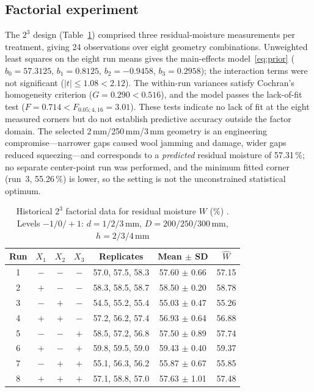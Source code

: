 \documentclass[journal]{IEEEtran}
\begin{document}
\subsection{Factorial experiment}
The $2^3$ design (Table~\ref{tab:doe}) comprised three residual-moisture measurements per
treatment, giving 24 observations over eight geometry combinations. Unweighted least squares on the eight run means
gives the main-effects model~\eqref{eq:prior} ($b_0=57.3125$, $b_1=0.8125$, $b_2=-0.9458$, $b_3=0.2958$); the
interaction terms were not significant ($|t|\le1.08<2.12$). The within-run variances satisfy Cochran's homogeneity
criterion ($G=0.290<0.516$), and the model passes the lack-of-fit test ($F=0.714<F_{0.05;4,16}=3.01$). These tests
indicate no lack of fit at the eight measured corners but do not establish predictive accuracy outside the factor domain.
The selected 2\,mm/250\,mm/3\,mm geometry is an engineering compromise---narrower gaps caused wool jamming and damage,
wider gaps reduced squeezing---and corresponds to a \emph{predicted} residual moisture of 57.31\,\%; no separate
center-point run was performed, and the minimum fitted corner (run~3, 55.26\,\%) is lower, so the setting is not the
unconstrained statistical optimum.

\begin{table}[t]\centering\small
\caption{Historical $2^3$ factorial data for residual moisture $W$ (\%) \cite{tuguzbayeva2024}.
Levels $-1/0/+1$: $d=1/2/3$\,mm, $D=200/250/300$\,mm, $h=2/3/4$\,mm}
\label{tab:doe}
\setlength{\tabcolsep}{3.5pt}
\begin{tabular}{ccccccc}\toprule
Run & $X_1$ & $X_2$ & $X_3$ & Replicates & Mean $\pm$ SD & $\hat W$\\\midrule
1 & $-$ & $-$ & $-$ & 57.0, 57.5, 58.3 & 57.60 $\pm$ 0.66 & 57.15\\
2 & $+$ & $-$ & $-$ & 58.3, 58.5, 58.7 & 58.50 $\pm$ 0.20 & 58.78\\
3 & $-$ & $+$ & $-$ & 54.5, 55.2, 55.4 & 55.03 $\pm$ 0.47 & 55.26\\
4 & $+$ & $+$ & $-$ & 57.2, 56.2, 57.4 & 56.93 $\pm$ 0.64 & 56.88\\
5 & $-$ & $-$ & $+$ & 58.5, 57.2, 56.8 & 57.50 $\pm$ 0.89 & 57.74\\
6 & $+$ & $-$ & $+$ & 59.8, 59.5, 59.0 & 59.43 $\pm$ 0.40 & 59.37\\
7 & $-$ & $+$ & $+$ & 55.1, 56.3, 56.2 & 55.87 $\pm$ 0.67 & 55.85\\
8 & $+$ & $+$ & $+$ & 57.1, 58.8, 57.0 & 57.63 $\pm$ 1.01 & 57.48\\\bottomrule
\end{tabular}\end{table}
\end{document}
